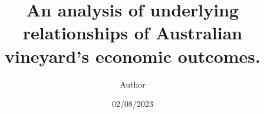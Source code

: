 \documentclass[review,12pt,authoryear]{elsarticle}
\begin{document}
\begin{linenumbers}
\begin{frontmatter}




\title{An analysis of underlying relationships of Australian vineyard's economic outcomes.}




\author[label1,label2,label3]{Author}
\date{02/08/2023}



\end{frontmatter}
\end{linenumbers}
\end{document}
